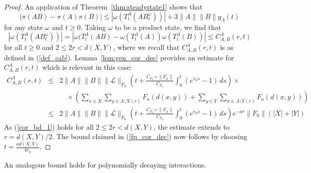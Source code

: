 \documentclass{article}
\newcommand{\<}{\langle}
\renewcommand{\>}{\rangle}
\numberwithin{equation}{section}
\theoremstyle{definition}
\begin{document}
\begin{proof}
An application of Theorem~\ref{thm:steadystate1} shows that
\begin{equation}
  |\pi(AB) - \pi(A) \pi(B)| \leq  | \omega(T_t^{\Lambda}(AB_t^{\omega}))| + 3 \| A \| \| B \| g_{\Lambda}(t) 
  \end{equation}
 for any state $\omega$ and $t \geq 0$. Taking $\omega$ to be a product state, we find that
 \begin{equation} \label{base_cor_est}
 | \omega(T_t^{\Lambda}(AB_t^{\omega}))| = |\omega(T^{\Lambda}_t(AB) - \omega(T^{\Lambda}_t(A))\omega(T^{\Lambda}_t(B))|\le C_{A,B}^{\Lambda}(r,t) 
 \end{equation}
 for all $t \geq 0$ and $2 \leq 2r <d(X,Y)$, where we recall that $C_{A,B}^{\Lambda}(r,t)$ is as defined in (\ref{def_cab}). Lemma~\ref{lem:gen_cor_dec} provides an estimate
 for $C_{A,B}^{\Lambda}(r,t)$ which is relevant in this case:
 \begin{eqnarray} \label{cor_bd_1}
C_{A,B}^{\Lambda}(r,t) & \leq & 2 \|A\| \| B \| \| \mathscr{L}\|_{F_a}  \left(t + \frac{C_{F_a}  +   \| F_a \|}{C_{F_a}} \int_0^t (e^{v_as} -1) \, ds \right)  \times \nonumber \\
& \mbox{ } & \quad  \times \left(  \sum_{x \in X}   \sum_{y \in \Lambda \setminus X(r)} F_a(d(x,y)) +
 \sum_{y \in Y} \sum_{x \in \Lambda \setminus Y(r)} F_a(d(x,y)) \right) \nonumber \\
& \leq & 2 \|A\| \| B \| \| \mathscr{L}\|_{F_a}  \left(t + \frac{C_{F_a}  +   \| F_a \|}{C_{F_a}} \int_0^t (e^{v_as} -1) \, ds \right) e^{-ar} \| F_0 \| (|X|+|Y|) 
\end{eqnarray}
As (\ref{cor_bd_1}) holds for all  $2 \leq 2r < d(X,Y)$, the estimate extends to $r=d(X,Y)/2$.
The bound claimed in (\ref{fp_cor_dec}) now follows
by choosing $t = \frac{ad(X,Y)}{4v_a}$.
\end{proof}

An analogous bound holds for polynomially decaying interactions.
\end{document}
